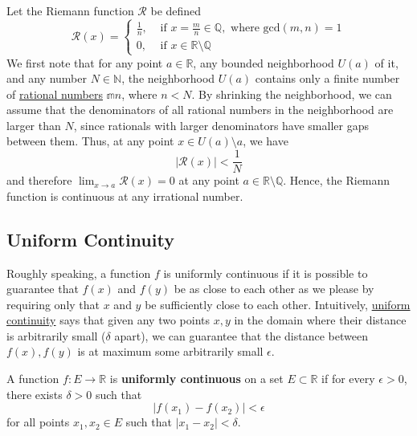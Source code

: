   \begin{example}
    \label{ex:riemann-function}
    Let the Riemann function $\mathcal{R}$ be defined
    \begin{equation}
      \mathcal{R}(x) = \begin{cases}
      \frac{1}{n}, & \text{ if } x = \frac{m}{n} \in \mathbb{Q}, \text{ where gcd}(m, n) = 1 \\
      0, & \text{ if } x \in \mathbb{R} \setminus \mathbb{Q}
      \end{cases}
    \end{equation}
    We first note that for any point $a \in \mathbb{R}$, any bounded neighborhood $U(a)$ of it, and any number $N \in \mathbb{N}$, the neighborhood $U(a)$ contains only a finite number of \hyperref[alg-def:rational-numbers]{rational numbers} $\mathbb{m}{n}$, where $n < N$. By shrinking the neighborhood, we can assume that the denominators of all rational numbers in the neighborhood are larger than $N$, since rationals with larger denominators have smaller gaps between them. Thus, at any point $x \in U(a) \setminus a$, we have 
    \begin{equation}
      \big| \mathcal{R}(x) \big| < \frac{1}{N}
    \end{equation}
    and therefore $\lim_{x \to a} \mathcal{R} (x) = 0$ at any point $a \in \mathbb{R} \setminus \mathbb{Q}$. Hence, the Riemann function is continuous at any irrational number. 
  \end{example}

\subsection{Uniform Continuity}

  Roughly speaking, a function $f$ is uniformly continuous if it is possible to guarantee that $f(x)$ and $f(y)$ be as close to each other as we please by requiring only that $x$ and $y$ be sufficiently close to each other. Intuitively, \hyperref[def:uniform-continuity]{uniform continuity} says that given any two points $x, y$ in the domain where their distance is arbitrarily small ($\delta$ apart), we can guarantee that the distance between $f(x), f(y)$ is at maximum some arbitrarily small $\epsilon$. 

  \begin{definition}
    \label{def:uniform-continuity}
    A function $f: E \to \mathbb{R}$ is \textbf{uniformly continuous} on a set $E \subset \mathbb{R}$ if for every $\epsilon > 0$, there exists $\delta > 0$ such that 
    \begin{equation}
      \big| f(x_1) - f(x_2)\big| < \epsilon
    \end{equation}
    for all points $x_1, x_2 \in E$ such that $|x_1 - x_2| < \delta$. 
  \end{definition}


